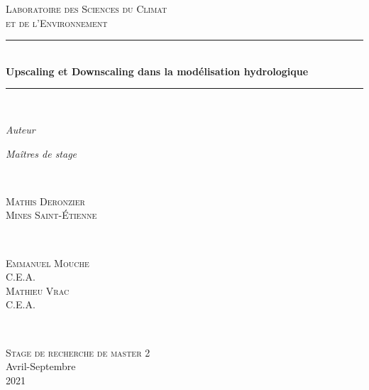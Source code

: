 \documentclass[a4paper,11pt]{article}
\begin{document}
		
\hypersetup{pdfborder=0 0 0}
\newcommand{\HRule}{\rule{\linewidth}{0.5mm}}
\begin{center}
	\textsc{\LARGE Laboratoire des Sciences du Climat} \\[0.3cm]
	\textsc{\LARGE et de l'Environnement}\\[1.5cm] 
	\HRule \\[0.5cm]
	{ \huge \bfseries Upscaling et Downscaling dans la modélisation hydrologique  }\\[0.4cm] 
	\HRule \\[1.5cm]
\end{center}

\begin{minipage}{0.4\textwidth}
	\begin{flushleft} \Large
		\emph{Auteur}\\
	\end{flushleft}
\end{minipage}

\begin{minipage}{0.4\textwidth}
	\begin{flushright} \Large
		\emph{Maîtres de stage} \\
	\end{flushright}
\end{minipage}\\[0.5 cm]
\begin{minipage}{0.4\textwidth}
	\begin{flushleft} \large
		\textsc{Mathis Deronzier}\\
		\textsc{Mines Saint-Étienne}
	\end{flushleft}
\end{minipage}
~
\begin{minipage}{0.4\textwidth}
	\begin{flushright} \large
		\textsc{Emmanuel Mouche}\\
		\textsc{C.E.A.}\\
		\textsc{Mathieu Vrac}\\
		\textsc{C.E.A.}
	\end{flushright}
\end{minipage}\\[2cm]
\begin{center}
	\textsc{\Large Stage de recherche de master 2}\\[0.5cm]  
	\large Avril-Septembre\\2021\\[2cm]
\end{center}
\end{document}
